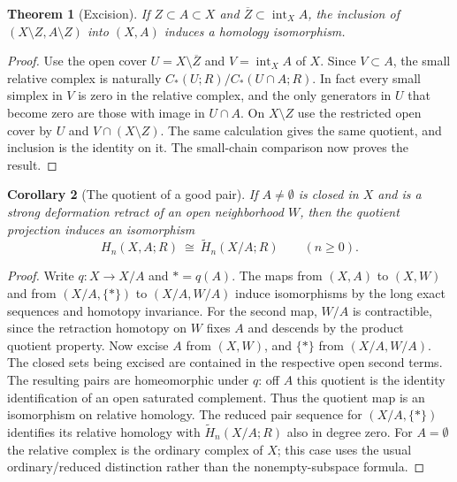 \documentclass[11pt,oneside,openany]{book}
\theoremstyle{plain}
\newtheorem{theorem}{Theorem}[chapter]
\newtheorem{corollary}[theorem]{Corollary}
\theoremstyle{definition}
\theoremstyle{remark}
\begin{document}
\begin{theorem}[Excision]
\label{thm:p202-excision}
If \(Z\subset A\subset X\) and
\(\overline{Z}\subset\operatorname{int}_X A\), the
inclusion of \((X\setminus Z,A\setminus Z)\) into
\((X,A)\) induces a homology isomorphism.
\end{theorem}

\begin{proof}
Use the open cover \(U=X\setminus\overline Z\) and
\(V=\operatorname{int}_X A\) of \(X\). Since
\(V\subset A\), the small relative complex is naturally
\(C_*(U;R)/C_*(U\cap A;R)\). In fact every small
simplex in \(V\) is zero in the relative complex, and
the only generators in \(U\) that become zero are those
with image in \(U\cap A\). On \(X\setminus Z\) use
the restricted open cover by \(U\) and
\(V\cap(X\setminus Z)\). The same calculation gives
the same quotient, and inclusion is the identity on
it. The small-chain comparison now proves the result.
\end{proof}

\begin{corollary}[The quotient of a good pair]
\label{thm:p202-good-pair}
If \(A\ne\emptyset\) is closed in \(X\) and is a strong
deformation retract of an open neighborhood \(W\), then
the quotient projection induces an isomorphism
\[
 H_n(X,A;R)\ \cong\ \widetilde H_n(X/A;R)
 \qquad (n\ge0).
\]
\end{corollary}

\begin{proof}
Write \(q:X\to X/A\) and \(*=q(A)\).
The maps from \((X,A)\) to \((X,W)\) and from
\((X/A,\{*\})\) to \((X/A,W/A)\) induce
isomorphisms by the long exact sequences and homotopy
invariance. For the second map, \(W/A\) is contractible,
since the retraction homotopy on \(W\) fixes \(A\)
and descends by the product quotient property.
Now excise \(A\) from \((X,W)\), and \(\{*\}\)
from \((X/A,W/A)\). The closed sets being excised
are contained in the respective open second terms.
The resulting pairs are homeomorphic under \(q\):
off \(A\) this quotient is the identity identification
of an open saturated complement. Thus the quotient
map is an isomorphism on relative homology.
The reduced pair sequence for \((X/A,\{*\})\) identifies
its relative homology with \(\widetilde H_n(X/A;R)\)
also in degree zero. For \(A=\emptyset\) the relative
complex is the ordinary complex of \(X\); this case
uses the usual ordinary/reduced distinction rather than
the nonempty-subspace formula.
\end{proof}
\end{document}
